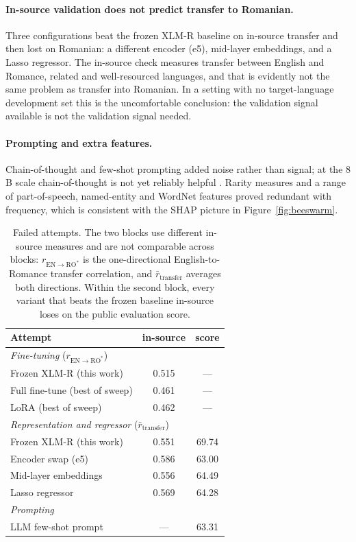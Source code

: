 \paragraph{In-source validation does not predict transfer to Romanian.}
Three configurations beat the frozen XLM-R baseline on in-source
transfer and then lost on Romanian: a different encoder (e5), mid-layer
embeddings, and a Lasso regressor. The in-source check measures transfer
between English and Romance, related and well-resourced languages, and
that is evidently not the same problem as transfer into Romanian. In a
setting with no target-language development set this is the
uncomfortable conclusion: the validation signal available is not the
validation signal needed.

\paragraph{Prompting and extra features.}
Chain-of-thought and few-shot prompting added noise rather than signal;
at the $8$B scale chain-of-thought is not yet reliably helpful
\citep{wei2022cot}. Rarity measures and a range of part-of-speech,
named-entity and WordNet features proved redundant with frequency,
which is consistent with the SHAP picture in
Figure~\ref{fig:beeswarm}.

\begin{table}[tbp]
\centering\small
\begin{tabular}{lcc}
\toprule
\textbf{Attempt} & \textbf{in-source} & \textbf{score} \\
\midrule
\multicolumn{3}{l}{\emph{Fine-tuning} ($r_{\mathrm{EN}\rightarrow\mathrm{RO}^{*}}$)} \\
Frozen XLM-R (this work) & 0.515 & --- \\
Full fine-tune (best of sweep) & 0.461 & --- \\
LoRA (best of sweep) & 0.462 & --- \\
\midrule
\multicolumn{3}{l}{\emph{Representation and regressor} ($\bar{r}_{\mathrm{transfer}}$)} \\
Frozen XLM-R (this work) & 0.551 & 69.74 \\
Encoder swap (e5) & 0.586 & 63.00 \\
Mid-layer embeddings & 0.556 & 64.49 \\
Lasso regressor & 0.569 & 64.28 \\
\midrule
\multicolumn{3}{l}{\emph{Prompting}} \\
LLM few-shot prompt & --- & 63.31 \\
\bottomrule
\end{tabular}
\caption{Failed attempts. The two blocks use different in-source measures and are not comparable across blocks:
$r_{\mathrm{EN}\rightarrow\mathrm{RO}^{*}}$ is the one-directional English-to-Romance transfer correlation, and
$\bar{r}_{\mathrm{transfer}}$ averages both directions. Within the second block, every variant that beats the
frozen baseline in-source loses on the public evaluation score.}
\label{tab:fail}
\end{table}

